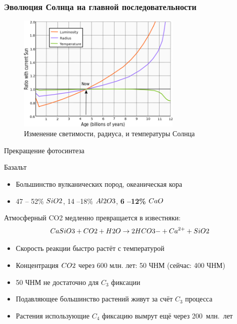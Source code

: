 \documentclass[aspectratio=169]{beamer}
\let\Ch\ch
\let\ch\relax
\begin{document}
\begin{frame}
\frametitle{Эволюция Солнца на главной последовательности}
\begin{figure}
\includegraphics[width=0.7\textwidth]{img/640px-Solar_evolution_(English).png}
\captionsetup{labelformat=empty}
\caption{Изменение светимости, радиуса, и температуры Солнца\cite{arXiv:0911.4872}}
\end{figure}
\end{frame}


\begin{frame}{Прекращение фотосинтеза}
\begin{block}{Базальт}
\begin{itemize}
\item Большинство вулканических пород, океаническая кора
\item 47 -- 52\% $\Ch{SiO2}$, 14 --18\% $\Ch{Al2O3}$, {\bf 6 --12\% $\Ch{CaO}$}
\end{itemize}
\end{block}
Атмосферный CO2 медленно превращается в известняки:
\begin{displaymath}
\nonumber
\Ch{CaSiO3} + \Ch{CO2} + \Ch{H2O} \to 2 \Ch{HCO3-} + \Ch{Ca^{2+}} + \Ch{SiO2}
\end{displaymath}

\begin{itemize}
\item Скорость реакции быстро растёт с температурой
\item Концентрация $\Ch{CO2}$ через 600 млн. лет: 50 ЧНМ (сейчас: 400 ЧНМ)
\item 50 ЧНМ не достаточно для $C_3$ фиксации
\item Подавляющее большинство растений живут за счёт $C_3$ процесса
\item Растения использующие $C_4$ фиксацию вымрут ещё через 200~млн.~лет
\end{itemize}

\end{frame}
\end{document}
